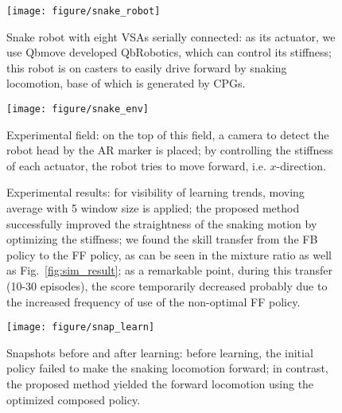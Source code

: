\documentclass{bmcart}
\begin{document}
\begin{backmatter}
\begin{figure}[!ht]
    \centering
    \texttt{[image: figure/snake\_robot]}
    \caption{Snake robot with eight VSAs serially connected:
    as its actuator, we use Qbmove developed QbRobotics, which can control its stiffness;
    this robot is on casters to easily drive forward by snaking locomotion, base of which is generated by CPGs.
    }
    \label{fig:snake_robot}
\end{figure}

\begin{figure}[!ht]
    \centering
    \texttt{[image: figure/snake\_env]}
    \caption{Experimental field:
    on the top of this field, a camera to detect the robot head by the AR marker is placed;
    by controlling the stiffness of each actuator, the robot tries to move forward, i.e. $x$-direction.
    }
    \label{fig:snake_env}
\end{figure}

\begin{figure}[!ht]
    \centering
    \centering
    \caption{Experimental results:
    for visibility of learning trends, moving average with 5 window size is applied;
    the proposed method successfully improved the straightness of the snaking motion by optimizing the stiffness;
    we found the skill transfer from the FB policy to the FF policy, as can be seen in the mixture ratio as well as Fig.~\ref{fig:sim_result};
    as a remarkable point, during this transfer (10-30 episodes), the score temporarily decreased probably due to the increased frequency of use of the non-optimal FF policy.
    }
    \label{fig:exp_result}
\end{figure}

\begin{figure}[!ht]
    \centering
    \texttt{[image: figure/snap\_learn]}
    \caption{Snapshots before and after learning:
    before learning, the initial policy failed to make the snaking locomotion forward;
    in contrast, the proposed method yielded the forward locomotion using the optimized composed policy.
    }
    \label{fig:snap_learn}
\end{figure}


\end{backmatter}
\end{document}
